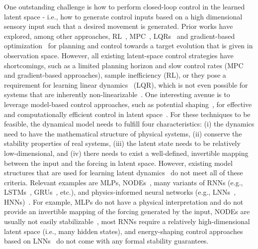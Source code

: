 One outstanding challenge is how to perform closed-loop control in the learned latent space - i.e., how to generate control inputs based on a high dimensional sensory input such that a desired movement is generated. Prior works have explored, among other approaches, \gls{RL}~\cite{van2016stable, gelada2019deepmdp, hafner2019dream, schwarting2021deep}, \gls{MPC}~\cite{lenz2015deepmpc, hafner2019learning, hewing2020learning, alora2023robust}, \glspl{LQR}~\cite{brunton2016koopman, mamakoukas2019local, haggerty2023control} and gradient-based optimization~\cite{yamada2023leveraging} for planning and control towards a target evolution that is given in observation space.
However, all existing latent-space control strategies have shortcomings, such as a limited planning horizon and slow control rates (\gls{MPC} and gradient-based approaches), sample inefficiency (RL), or they pose a requirement for learning linear dynamics~\cite{watter2015embed} (\gls{LQR}), which is not even possible for systems that are inherently non-linearizable~\cite{cenedese2022data}.
One interesting avenue is to leverage model-based control approaches, such as potential shaping~\cite{bloch2001controlled, ortega2021pid, zhong2020unsupervised}, for effective and computationally efficient control in latent space~\cite{lepri2023neural}. 
For these techniques to be feasible, the dynamical model needs to fulfill four characteristics: (i) the dynamics need to have the mathematical structure of physical systems, (ii) conserve the stability properties of real systems, (iii) the latent state needs to be relatively low-dimensional, and (iv) there needs to exist a well-defined, invertible mapping between the input and the forcing in latent space.
However, existing model structures that are used for learning latent dynamics~\cite{botev2021priors} do not meet all of these criteria. Relevant examples are \glspl{MLP}, \glspl{NODE}~\cite{chen2018neural, sholokhov2023physics}, many variants of \glspl{RNN} (e.g., LSTMs~\cite{hochreiter1997long}, \glspl{GRU}~\cite{cho2014learning}, etc.), and physics-informed neural networks (e.g., \glspl{LNN}~\cite{lutter2018deep, cranmer2020lagrangian, zhong2020unsupervised}, \glspl{HNN})~\cite{greydanus2019hamiltonian}. For example, \glspl{MLP} do not have a physical interpretation and do not provide an invertible mapping of the forcing generated by the input, \glspl{NODE} are usually not easily stabilizable~\cite{white2023stabilized}, most \glspl{RNN} require a relatively high-dimensional latent space (i.e., many hidden states), and energy-shaping control approaches based on \glspl{LNN}~\cite{zhong2020unsupervised} do not come with any formal stability guarantees. %

